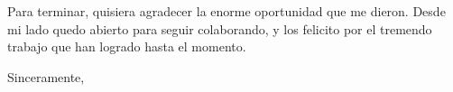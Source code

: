 \documentclass[11pt, a4paper]{letter} %
\renewcommand{\closing}[1]{
	\vspace{2.5mm} %
	\noindent %
	\hspace*{\longindentation} %
	\parbox{\indentedwidth}{
		\raggedright
		#1 %
		\vskip 1.65cm %
		\fromsig %
	}
}
\begin{document}
\begin{letter}{
}
Para terminar, quisiera agradecer la enorme oportunidad que me dieron. Desde mi lado quedo abierto para seguir colaborando, y los felicito por el tremendo trabajo que han logrado hasta el momento.

\closing{Sinceramente,}




\end{letter}
\end{document}
